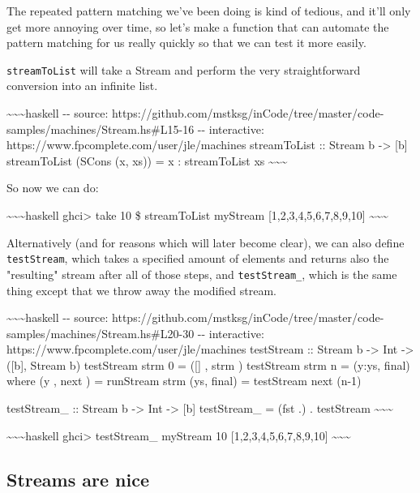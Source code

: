 \documentclass[]{article}
\begin{document}
The repeated pattern matching we've been doing is kind of tedious, and it'll
only get more annoying over time, so let's make a function that can automate the
pattern matching for us really quickly so that we can test it more easily.

\texttt{streamToList} will take a Stream and perform the very straightforward
conversion into an infinite list.

\textasciitilde{}\textasciitilde{}\textasciitilde{}haskell -\/- source:
https://github.com/mstksg/inCode/tree/master/code-samples/machines/Stream.hs\#L15-16
-\/- interactive: https://www.fpcomplete.com/user/jle/machines streamToList ::
Stream b -\textgreater{} {[}b{]} streamToList (SCons (x, xs)) = x : streamToList
xs \textasciitilde{}\textasciitilde{}\textasciitilde{}

So now we can do:

\textasciitilde{}\textasciitilde{}\textasciitilde{}haskell ghci\textgreater{}
take 10 \$ streamToList myStream {[}1,2,3,4,5,6,7,8,9,10{]}
\textasciitilde{}\textasciitilde{}\textasciitilde{}

Alternatively (and for reasons which will later become clear), we can also
define \texttt{testStream}, which takes a specified amount of elements and
returns also the "resulting" stream after all of those steps, and
\texttt{testStream\_}, which is the same thing except that we throw away the
modified stream.

\textasciitilde{}\textasciitilde{}\textasciitilde{}haskell -\/- source:
https://github.com/mstksg/inCode/tree/master/code-samples/machines/Stream.hs\#L20-30
-\/- interactive: https://www.fpcomplete.com/user/jle/machines testStream ::
Stream b -\textgreater{} Int -\textgreater{} ({[}b{]}, Stream b) testStream strm
0 = ({[}{]} , strm ) testStream strm n = (y:ys, final) where (y , next ) =
runStream strm (ys, final) = testStream next (n-1)

testStream\_ :: Stream b -\textgreater{} Int -\textgreater{} {[}b{]}
testStream\_ = (fst .) . testStream
\textasciitilde{}\textasciitilde{}\textasciitilde{}

\textasciitilde{}\textasciitilde{}\textasciitilde{}haskell ghci\textgreater{}
testStream\_ myStream 10 {[}1,2,3,4,5,6,7,8,9,10{]}
\textasciitilde{}\textasciitilde{}\textasciitilde{}

\subsection{Streams are nice}
\end{document}
